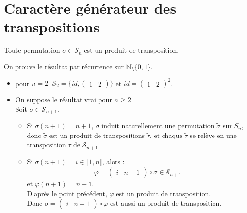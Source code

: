 \documentclass[../main.tex]{subfiles}
\begin{document}
\section{Caractère générateur des transpositions}
\begin{tcolorbox}[title=Théorème 29.37, title filled=false, colframe=orange, colback=orange!10!white]
    Toute permutation $\sigma\in \mathcal{S}_n$ est un produit de transposition. 
\end{tcolorbox}

\noindent On prouve le résultat par récurrence sur $\mathbb{N}\setminus \{0, 1\}$. 
\begin{itemize}
    \item pour $n=2$, $\mathcal{S}_2 = \{ id, \begin{pmatrix}
        1 & 2
    \end{pmatrix} \}$ et $id = \begin{pmatrix}
        1 & 2
    \end{pmatrix}^2$. 

    \item On suppose le résultat vrai pour $n\geq 2$. \\
    Soit $\sigma\in \mathcal{S}_{n+1}$. \\
    \begin{itemize}
        \item Si $\sigma(n+1) = n+1$, $\sigma$ induit naturellement une permutation $\tilde \sigma$ sur $S_n$, donc $\tilde \sigma$ est un produit de transpositions $\tilde\tau$, et chaque $\tilde\tau$ se relève en une transposition $\tau$ de $\mathcal{S}_{n+1}$. 
        \item Si $\sigma(n+1) = i\in \llbracket 1, n \rrbracket$, alors : 
        \begin{align*}
            \varphi = \begin{pmatrix}
                i & n+1
            \end{pmatrix}
            \circ \sigma \in \mathcal{S}_{n+1}
        \end{align*}
        et $\varphi(n+1) = n+1$. \\
        D'après le point précédent, $\varphi$ est un produit de transposition. \\
        Donc $\sigma = \begin{pmatrix}
            i & n+1
        \end{pmatrix} \circ \varphi$ est aussi un produit de transposition. 
    \end{itemize}
\end{itemize}
\end{document}
